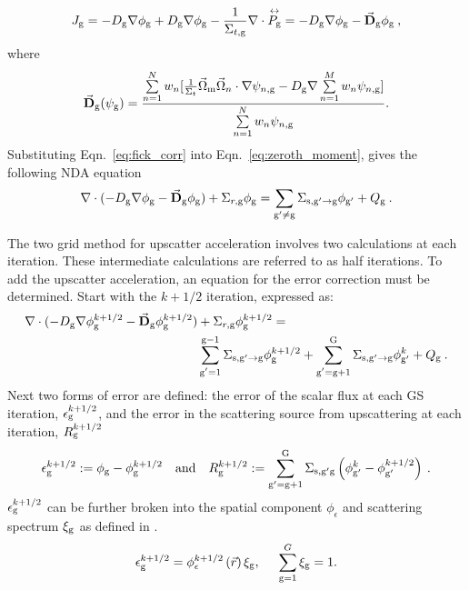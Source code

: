   \begin{equation}
  J_{\mathrm{g}} = -D_{\mathrm{g}} \nabla \phi_{\mathrm{g}} + D_{\mathrm{g}} \nabla \phi_{\mathrm{g}} - \frac{1}{\Sigma_{t, \mathrm{g}}} \nabla \cdot \overset{\text{\scriptsize$\leftrightarrow$}}{P_{\mathrm{g}}} \\
  = -D_{\mathrm{g}} \nabla \phi_{\mathrm{g}} - \vec{\textbf{D}}_{\mathrm{g}} \phi_{\mathrm{g}} \:,
  \label{eq:fick_corr}
  \end{equation}
  where 
 \begin{equation}
  \vec{\textbf{D}}_{\mathrm{g}} (\psi_{\mathrm{g}}) = \frac{\sum\limits_{n=1}^N w_n [\frac{1}{\Sigma_t} \vec{\Omega}_{\mathrm{m}} \vec{\Omega}_n \cdot \nabla\psi_{n, \mathrm{g}} - D_{\mathrm{g}} \nabla \sum\limits_{n=1}^M w_n\psi_{n, \mathrm{g}}]}{\sum\limits_{n=1}^N w_n \psi_{n, \mathrm{g}}}.
  \end{equation} 
 Substituting Eqn.~\eqref{eq:fick_corr} into Eqn.~\eqref{eq:zeroth_moment}, gives the following NDA equation
  \begin{equation}
  \nabla\cdot(-D_{\mathrm{g}} \nabla \phi_{\mathrm{g}} - \vec{\bf D}_{\mathrm{g}} \phi_{\mathrm{g}}) + \Sigma_{r,\mathrm{g}} \phi_{\mathrm{g}} = \sum\limits_{{\mathrm{g}'}\neq\mathrm{g}}\Sigma_{\mathrm{s},\mathrm{g}' \rightarrow \mathrm{g}}\phi_{\mathrm{g}'} + Q_{\mathrm{g}} \:. \label{eq:NDA}
  \end{equation}
  
  The two grid method for upscatter acceleration involves two calculations at each iteration. These intermediate calculations are referred to as half iterations. To add the upscatter acceleration, an equation for the error correction must be determined. Start with the $k + 1/2$ iteration, expressed as:
  \begin{equation}
  \begin{split}
  \nabla\cdot(-D_{\mathrm{g}} \nabla \phi_{\mathrm{g}}^{k+1/2} - \vec{\bf D}_{\mathrm{g}} \phi_{\mathrm{g}}^{k+1/2}) &+ \Sigma_{r,\mathrm{g}} \phi_{\mathrm{g}}^{k+1/2} =  \\ &\sum\limits_{\substack{\mathrm{g}'=1}}^{\mathrm{g-1}} \Sigma_{\mathrm{s},\mathrm{g}' \to\mathrm{g}}\phi_{\mathrm{g}}^{k+1/2} + \sum\limits_{\substack{\mathrm{g}'=\mathrm{g}+1}}^{\mathrm{G}} \Sigma_{\mathrm{s},\mathrm{g}' \to\mathrm{g}}\phi_{\mathrm{g}'}^{k} + Q_{\mathrm{g}}\:. 
  \end{split}
  \label{eq:k1/2}
  \end{equation}
  Next two forms of error are defined: the error of the scalar flux at each GS iteration, $\epsilon_{\mathrm{g}}^{k+1/2}$, and the error in the scattering source from upscattering at each iteration, $R_{\mathrm{g}}^{k+1/2}$
  \begin{equation}
  \epsilon_{\mathrm{g}}^{k+1/2} := \phi_{\mathrm{g}} - \phi_{\mathrm{g}}^{k + 1/2} \quad \mathrm{and} \quad R_{\mathrm{g}}^{k+1/2} := \sum\limits_{\mathrm{g}'=\mathrm{g}+1}^{\mathrm{G}} \Sigma_{\mathrm{s},\mathrm{g}' \mathrm{g}}\left(\phi_{\mathrm{g}'}^k - \phi_{\mathrm{g}'}^{k + 1/2}\right)\:.
  \end{equation}
  $\epsilon_{\mathrm{g}}^{k + 1/2}$ can be further broken into the spatial component $\phi_{\epsilon}$ and scattering spectrum $\xi_{\mathrm{g}}$ as defined in \cite{morel-upscat, evans-upscat}.
  \begin{equation}
  \epsilon_{\mathrm{g}}^{k+1/2} = \phi_{\epsilon}^{k+1/2}\left(\vec{r}\right)\xi_{\mathrm{g}}, \hspace{5mm} \sum\limits_{\mathrm{g}=1}^G \xi_{\mathrm{g}} = 1.
  \label{eq:decomp}
  \end{equation}
  
